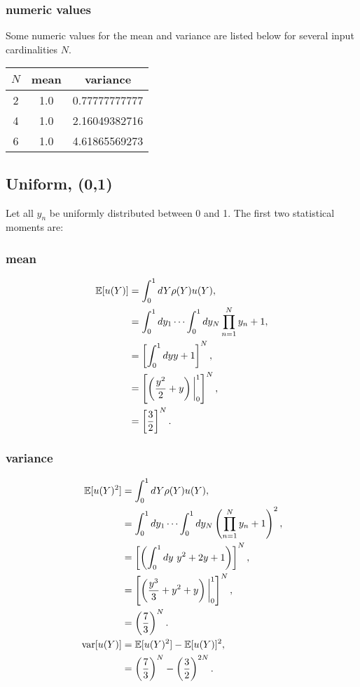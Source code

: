 \subsubsection{numeric values}
Some numeric values for the mean and variance are listed below for several input cardinalities $N$.
\begin{table}[h!]
  \centering
  \begin{tabular}{c|c|c}
    $N$ & mean & variance \\ \hline
    2 & 1.0 & 0.77777777777 \\
    4 & 1.0 & 2.16049382716 \\
    6 & 1.0 & 4.61865569273
  \end{tabular}
\end{table}

\subsection{Uniform, (0,1)}
Let all $y_n$ be uniformly distributed between 0 and 1.  The first two statistical moments are:

\subsubsection{mean}
\begin{align}
\mathbb{E}[ u(Y)] &=\int_{0}^1 dY \rho(Y)u(Y),\\
  &=\int_{0}^1 dy_1\cdots\int_{0}^1 dy_N \prod_{n=1}^N y_n+1,\\
  &=\left[ \int_{0}^1 dy y+1\right]^N,\\
  &=\left[\left(\frac{y^2}{2}+y\right)\bigg|_{0}^1\right]^N,\\
  &=\left[\frac{3}{2}\right]^N.
\end{align}

\subsubsection{variance}
\begin{align}
\mathbb{E}[ u(Y)^2] &= \int_{0}^1 dY \rho(Y)u(Y),\\
  &=\int_{0}^1 dy_1\cdots\int_{0}^1 dy_N \left(\prod_{n=1}^N y_n+1\right)^2,\\
  &=\left[\left(\int_{0}^1 dy\ y^2+2y+1 \right)\right]^N,\\
  &=\left[\left(\frac{y^3}{3}+y^2+y \right)\bigg|_{0}^1 \right]^N,\\
  &=\left(\frac{7}{3}\right)^N.\\
\text{var}[u(Y)] &= \mathbb{E}[ u(Y)^2]-\mathbb{E}[ u(Y)]^2,\\
  &= \left(\frac{7}{3}\right)^N-\left(\frac{3}{2}\right)^{2N}.
\end{align}

